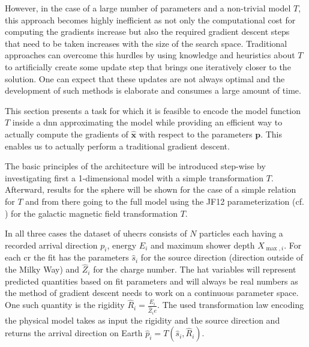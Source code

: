 However, in the case of a large number of parameters and a non-trivial model \(T\), this approach becomes highly inefficient as not only the computational cost for computing the gradients increase but also the required gradient descent steps that need to be taken increases with the size of the search space. Traditional approaches can overcome this hurdles by using knowledge and heuristics about \(T\) to artificially create some update step that brings one iteratively closer to the solution. One can expect that these updates are not always optimal and the development of such methods is elaborate and consumes a large amount of time.

This section presents a task for which it is feasible to encode the model function \(T\) inside a \gls{dnn} approximating the model while providing an efficient way to actually compute the gradients of \(\hat {\bm x}\) with respect to the parameters \(\bm p\). This enables us to actually perform a traditional gradient descent.

\label{ssec:fit-architecture}

The basic principles of the architecture will be introduced step-wise by investigating first a 1-dimensional model with a simple transformation \(T\). Afterward, results for the sphere will be shown for the case of a simple relation for \(T\) and from there going to the full model using the JF12 parameterization (cf. ) for the galactic magnetic field transformation \(T\).

In all three cases the dataset of \glspl{uhecr} consists of \(N\) particles each having a recorded arrival direction \(p_i\), energy \(E_i\) and maximum shower depth \(X_{\max, i}\). For each \gls{cr} the fit has the parameters \(\hat s_i\) for the source direction (direction outside of the Milky Way) and \(\hat Z_i\) for the charge number. The hat variables will represent predicted quantities based on fit parameters and will always be real numbers as the method of gradient descent needs to work on a continuous parameter space. One such quantity is the rigidity \(\hat R_i = \frac{E_i}{\hat Z_i e}\). The used transformation law encoding the physical model takes as input the rigidity and the source direction and returns the arrival direction on Earth \(\hat p_i = T(\hat s_i, \hat R_i)\).

